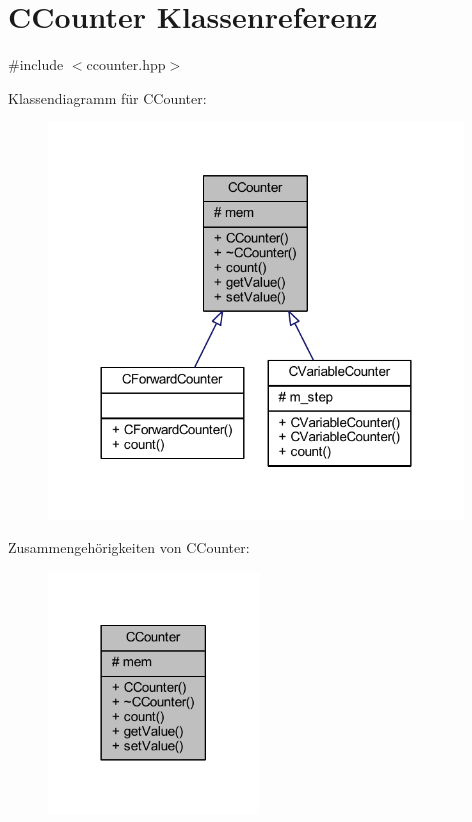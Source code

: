 \hypertarget{class_c_counter}{}\section{C\+Counter Klassenreferenz}
\label{class_c_counter}


{\ttfamily \#include $<$ccounter.\+hpp$>$}



Klassendiagramm für C\+Counter\+:
\nopagebreak
\begin{figure}[H]
\begin{center}
\leavevmode
\includegraphics[width=312pt]{class_c_counter__inherit__graph}
\end{center}
\end{figure}


Zusammengehörigkeiten von C\+Counter\+:\nopagebreak
\begin{figure}[H]
\begin{center}
\leavevmode
\includegraphics[width=158pt]{class_c_counter__coll__graph}
\end{center}
\end{figure}
